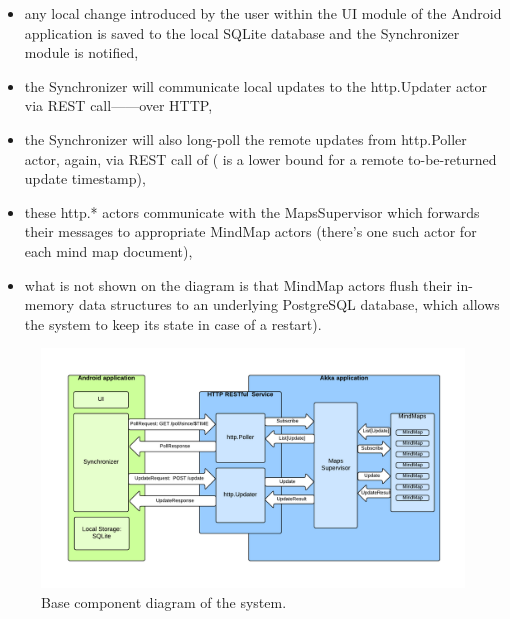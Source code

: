 \begin{itemize}
	\item any local change introduced by the user within the UI module of the Android application is saved to the local SQLite database and the Synchronizer module is notified,
	\item the Synchronizer will communicate local updates to the http.Updater actor via REST call------over HTTP,
	\item the Synchronizer will also long-poll the remote updates from http.Poller actor, again, via REST call of  ( is a lower bound for a remote to-be-returned update timestamp),
  \item these http.* actors communicate with the MapsSupervisor which forwards their messages to appropriate MindMap actors (there's one such actor for each mind map document),
  \item what is not shown on the diagram is that MindMap actors flush their in-memory data structures to an underlying PostgreSQL database, which allows the system to keep its state in case of a restart).
\end{itemize}

\begin{figure}[h]
	\centering
	\includegraphics[width=\textwidth]{component-diagram}
	\caption{Base component diagram of the system.}
	\label{fig:diagram-components-system}
\end{figure}





